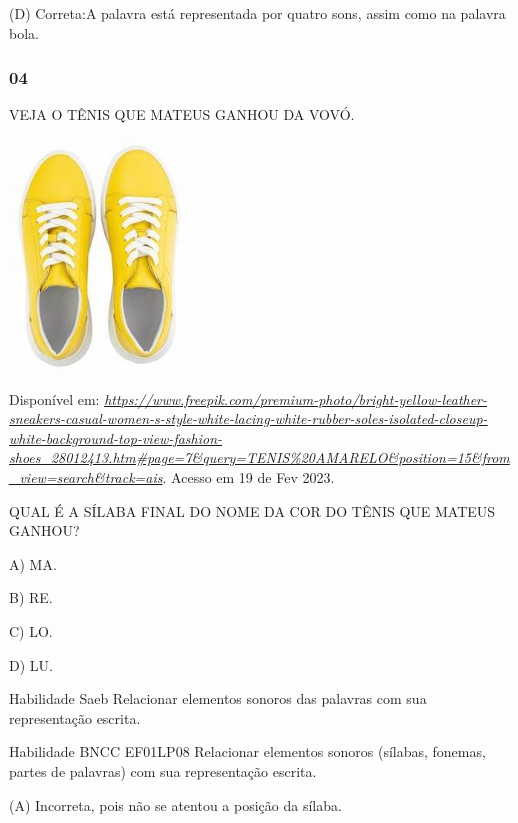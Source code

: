 (D) Correta:A palavra está representada por quatro sons, assim como na
palavra bola.

\subsubsection{04}\label{section-29}

\protect\hypertarget{_heading=h.1hmsyys}{}{}VEJA O TÊNIS QUE MATEUS
GANHOU DA VOVÓ.

\includegraphics[width=1.87986in,height=2.41667in]{media/image189.jpg}

Disponível em:
\href{https://www.freepik.com/premium-photo/bright-yellow-leather-sneakers-casual-women-s-style-white-lacing-white-rubber-soles-isolated-closeup-white-background-top-view-fashion-shoes_28012413.htm\#page=7\&query=TENIS\%20AMARELO\&position=15\&from_view=search\&track=ais}{\emph{https://www.freepik.com/premium-photo/bright-yellow-leather-sneakers-casual-women-s-style-white-lacing-white-rubber-soles-isolated-closeup-white-background-top-view-fashion-shoes\_28012413.htm\#page=7\&query=TENIS\%20AMARELO\&position=15\&from\_view=search\&track=ais}}.
Acesso em 19 de Fev 2023.

QUAL É A SÍLABA FINAL DO NOME DA COR DO TÊNIS QUE MATEUS GANHOU?

A) MA.

B) RE.

C) LO.

D) LU.

\protect\hypertarget{_heading=h.41mghml}{}{}Habilidade Saeb Relacionar
elementos sonoros das palavras com sua representação escrita.

Habilidade BNCC EF01LP08 Relacionar elementos sonoros (sílabas, fonemas,
partes de palavras) com sua representação escrita.

\protect\hypertarget{_heading=h.2grqrue}{}{}(A) Incorreta, pois não se
atentou a posição da sílaba.

